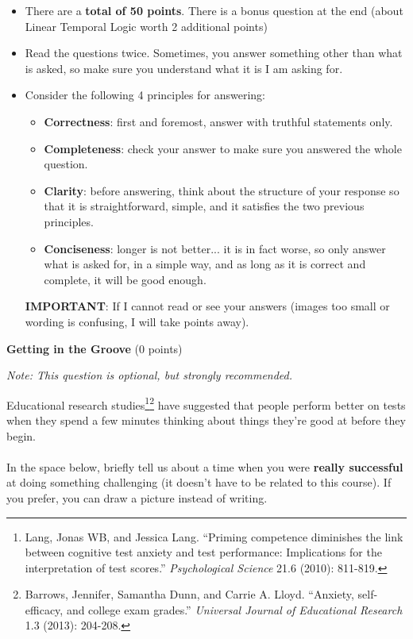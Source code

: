 \documentclass[12pt]{article}
\newenvironment{question}[2][Question]{\begin{trivlist}
\item[\hskip \labelsep {\bfseries #1}\hskip \labelsep {\bfseries #2.}]}{\end{trivlist}}
\begin{document}
\begin{itemize}
    \item There are a \textbf{total of 50 points}. There is a bonus question at the end (about Linear Temporal Logic worth 2 additional points)
    \item Read the questions twice. Sometimes, you answer something other than what is asked, so make sure you understand what it is I am asking for.
    \item Consider the following 4 principles for answering:
    \begin{itemize}
        \item \textbf{Correctness}: first and foremost, answer with truthful statements only.
        \item \textbf{Completeness}: check your answer to make sure you answered the whole question.
        \item \textbf{Clarity}: before answering, think about the structure of your response so that it is straightforward, simple, and it satisfies the two previous principles.
        \item \textbf{Conciseness}: longer is not better... it is in fact worse, so only answer what is asked for, in a simple way, and as long as it is correct and complete, it will be good enough.
    \end{itemize}

\textbf{IMPORTANT}: If I cannot read or see your answers (images too small or wording is confusing, I will take points away).
\end{itemize}


\bigskip

\begin{question}{0}\textbf{Getting in the Groove} (0 points)
\begin{center}
\textit{Note: This question is optional, but strongly recommended.}
\end{center}
Educational research studies\footnote{\scriptsize{Lang, Jonas WB, and Jessica Lang. ``Priming competence diminishes the link between cognitive test anxiety and test performance: Implications for the interpretation of test scores.'' \textit{Psychological Science} 21.6 (2010): 811-819.}}\footnote{\scriptsize{Barrows, Jennifer, Samantha Dunn, and Carrie A. Lloyd. ``Anxiety, self-efficacy, and college exam grades.'' \textit{Universal Journal of Educational Research} 1.3 (2013): 204-208.}} have suggested that people perform better on tests when they spend a few minutes thinking about things they're good at before they begin.\\\\
In the space below, briefly tell us about a time when you were \textbf{really successful} at doing something challenging (it doesn't have to be related to this course). If you prefer, you can draw a picture instead of writing.\\
\vfill
\hfill
\end{question}
\end{document}
